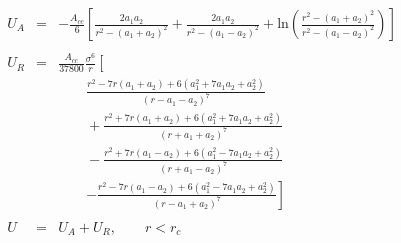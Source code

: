 


\begin{eqnarray}
U_A &=& - \frac{A_{cc}}{6} \left[
  \frac{2 a_1 a_2}{r^2-\left(a_1+a_2\right)^2}
  + \frac{2 a_1 a_2}{r^2 - \left(a_1 - a_2\right)^2}
  + \mathrm{ln}
  \left( 
  \frac{r^2-\left(a_1+a_2\right)^2}{r^2-\left(a_1-a_2\right)^2}
  \right)
  \right] \nonumber \\
\nonumber \\
U_R &=& \frac{A_{cc}}{37800}  \frac{\sigma^6}{r}
\left[ \frac{}{} \right. \nonumber \\
  &&\qquad		\frac{r^2-7r\left(a_1+a_2\right)+6\left(a_1^2+7a_1a_2+a_2^2\right)}
  {\left(r-a_1-a_2\right)^7} \nonumber \\
  &&\qquad		+\frac{r^2+7r\left(a_1+a_2\right)+6\left(a_1^2+7a_1a_2+a_2^2\right)}
  {\left(r+a_1+a_2\right)^7} \nonumber \\
  &&\qquad		-\frac{r^2+7r\left(a_1-a_2\right)+6\left(a_1^2-7a_1a_2+a_2^2\right)}
  {\left(r+a_1-a_2\right)^7} \nonumber \\
  &&\qquad	\left.	-\frac{r^2-7r\left(a_1-a_2\right)+6\left(a_1^2-7a_1a_2+a_2^2\right)}
  {\left(r-a_1+a_2\right)^7}
  \right] \nonumber \\
\nonumber \\
U &=& U_A + U_R, \qquad r < r_c \nonumber
\end{eqnarray}



